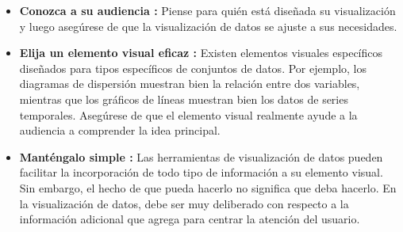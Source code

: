\begin{itemize}
  \item {\textbf{Conozca a su audiencia :}} Piense para quién está diseñada su
  visualización y luego asegúrese de que la visualización de datos se ajuste a
  sus necesidades.
  \item {\textbf{Elija un elemento visual eficaz :}} Existen elementos visuales
  específicos diseñados para tipos específicos de conjuntos de datos. Por ejemplo,
  los diagramas de dispersión muestran bien la relación entre dos variables,
  mientras que los gráficos de líneas muestran bien los datos de series temporales.
  Asegúrese de que el elemento visual realmente ayude a la audiencia a comprender
  la idea principal.
  \item {\textbf{Manténgalo simple :}} Las herramientas de visualización de datos
  pueden facilitar la incorporación de todo tipo de información a su elemento visual.
  Sin embargo, el hecho de que pueda hacerlo no significa que deba hacerlo. En la
  visualización de datos, debe ser muy deliberado con respecto a la información
  adicional que agrega para centrar la atención del usuario.
\end{itemize}
